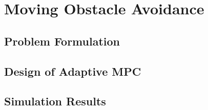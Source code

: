 \chapter{Moving Obstacle Avoidance}
\section{Problem Formulation}
\section{Design of Adaptive MPC}
\section{Simulation Results}